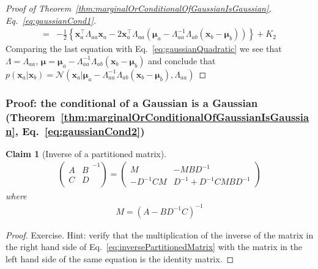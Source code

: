 \documentclass[11pt]{beamer}
\newtheorem{claim}{Claim}
\begin{document}
\begin{frame}
\begin{proof}[Proof of Theorem~\ref{thm:marginalOrConditionalOfGaussianIsGaussian}, Eq.~\ref{eq:gaussianCond1}]
\begin{align*}
			                  =&-\frac{1}{2}\left\{\mathbf{x}_a^\intercal\Lambda_{aa}\mathbf{x}_a-2\mathbf{x}_a^\intercal\Lambda_{aa}(\boldsymbol{\mu}_a-\Lambda_{aa}^{-1}\Lambda_{ab}(\mathbf{x}_b-\boldsymbol{\mu}_b))\right\}+K_2
		\end{align*}
		Comparing the last equation with Eq.~\ref{eq:gaussianQuadratic} we see that $\Lambda=\Lambda_{aa}$, $\boldsymbol{\mu}=\boldsymbol{\mu}_a-\Lambda_{aa}^{-1}\Lambda_{ab}(\mathbf{x}_b-\boldsymbol{\mu}_b)$ and conclude that $p(\mathbf{x}_a|\mathbf{x}_b)=\mathcal{N}(\mathbf{x}_a|\boldsymbol{\mu}_a-\Lambda_{aa}^{-1}\Lambda_{ab}(\mathbf{x}_b-\boldsymbol{\mu}_b),\Lambda_{aa})$
		\normalsize
	\end{proof}
\end{frame}

\begin{frame}
    \frametitle{Proof: the conditional of a Gaussian is a Gaussian (Theorem~\ref{thm:marginalOrConditionalOfGaussianIsGaussian}, Eq.~\ref{eq:gaussianCond2})}

	\begin{claim}[Inverse of a partitioned matrix]
		\begin{align}
			\left(\begin{array}{cc}
				      A & B\\
				      C & D
				  \end{array}^{-1}\right)=
			\left(\begin{array}{cc}
				      M         & -MBD^{-1}\\
					  -D^{-1}CM & D^{-1} + D^{-1}CMBD^{-1}
				  \end{array}\right)\label{eq:inversePartitionedMatrix}
		\end{align}
		where
		\begin{align*}
			M = (A - BD^{-1}C)^{-1}
		\end{align*}
	\end{claim}
	\begin{proof}
		\scriptsize
		Exercise. Hint: verify that the multiplication of the inverse of the matrix in the right hand side of Eq.~\ref{eq:inversePartitionedMatrix} with the matrix in the left hand side of the same equation is the identity matrix.
		\phantom\qedhere
		\normalsize
	\end{proof}
\end{frame}
\end{document}
